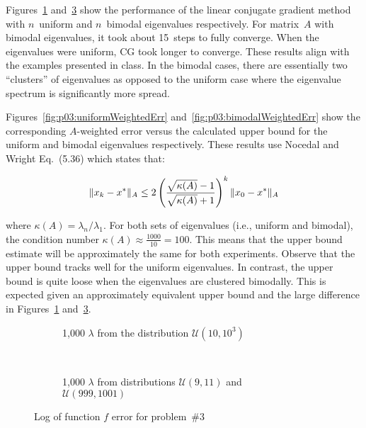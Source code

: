 Figures~\ref{fig:p03:uniformEigenvalues} and~\ref{fig:p03:bimodalEigenvalues} show the performance of the linear conjugate gradient method with $n$~uniform and $n$~bimodal eigenvalues respectively.  For matrix~$A$ with bimodal eigenvalues, it took about 15~steps to fully converge.  When the eigenvalues were uniform, CG took longer to converge.  These results align with the examples presented in class.  In the bimodal cases, there are essentially two ``clusters'' of eigenvalues as opposed to the uniform case where the eigenvalue spectrum is significantly more spread.

Figures~\ref{fig:p03:uniformWeightedErr} and~\ref{fig:p03:bimodalWeightedErr} show the corresponding $A$-weighted error versus the calculated upper bound for the uniform and bimodal eigenvalues respectively.  These results use Nocedal and Wright Eq.~(5.36) which states that:

\[ \lVert x_k - x^{*}\rVert_{A} \leq 2\left(\frac{\sqrt{\kappa(A)}-1}{\sqrt{\kappa(A)}+1}\right)^{k}\lVert x_0 - x^{*}\rVert_{A} \]

\noindent
where $\kappa(A)=\lambda_n / \lambda_1$. For both sets of eigenvalues (i.e., uniform and bimodal), the condition number ${\kappa(A) \approx \frac{1000}{10} = 100}$.  This means that the upper bound estimate will be approximately the same for both experiments.  Observe that the upper bound tracks well for the uniform eigenvalues.  In contrast, the upper bound is quite loose when the eigenvalues are clustered bimodally.  This is expected given an approximately equivalent upper bound and the large difference in Figures~\ref{fig:p03:uniformEigenvalues} and~\ref{fig:p03:bimodalEigenvalues}.

\newpage
\begin{figure}[p]
  \centering
  \begin{subfigure}[t]{0.45\textwidth}
    \centering
    
    \caption{\scriptsize 1,000 $\lambda$ from the distribution $\mathcal{U}(10,10^{3})$}\label{fig:p03:uniformEigenvalues}
  \end{subfigure}
  ~
  \begin{subfigure}[t]{0.45\textwidth}
    \centering
    
    \caption{\scriptsize 1,000 $\lambda$ from distributions $\mathcal{U}(9,11)$ and $\mathcal{U}(999,1001)$ }\label{fig:p03:bimodalEigenvalues}
  \end{subfigure}
  \caption{Log of function $f$ error for problem~\#3}
\end{figure}

